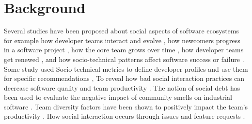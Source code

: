

\section{Background}

Several studies have been proposed about social aspects of software ecosystems for example how developer teams interact and evolve \cite{lopezfernandez2006:sna}, how newcomers progress in a software project \cite{Zhou2011-ICSE,Zhou2012-ICSE}, how the core team grows over time \cite{Robles2009MSR}, how developer teams get renewed \cite{Constantinou2017SANER}, and how socio-technical patterns affect software success or failure \cite{SurianTLCL13}.  Some study used Socio-technical metrics to define developer profiles and use them for specific recommendations \cite{Kintab:2014:RSE:2735522.2735526}, To reveal how bad social interaction practices can decrease software quality and team productivity \cite{Zanetti2013CHASE}. The notion of social debt has been used to evaluate the negative impact of community smells on industrial software \cite{Tamburri2015}. Team diversity factors have been shown to positively impact the team’s productivity \cite{Vasilescu2015CHI}. How social interaction occurs through issues and feature requests \cite{8049385}. 
